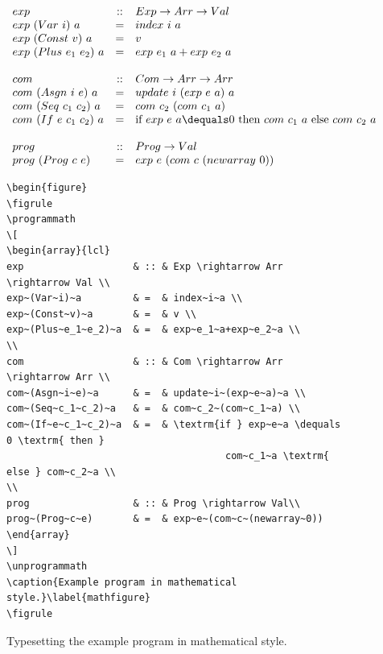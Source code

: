 \documentclass{article}
\begin{document}
\begin{figure}
\figrule
\programmath
\[
\begin{array}{lcl}
exp                   & :: & Exp \rightarrow Arr \rightarrow Val \\
exp~(Var~i)~a         & =  & index~i~a \\
exp~(Const~v)~a       & =  & v \\
exp~(Plus~e_1~e_2)~a  & =  & exp~e_1~a+exp~e_2~a \\
\\
com                   & :: & Com \rightarrow Arr \rightarrow Arr \\
com~(Asgn~i~e)~a      & =  & update~i~(exp~e~a)~a \\
com~(Seq~c_1~c_2)~a   & =  & com~c_2~(com~c_1~a) \\
com~(If~e~c_1~c_2)~a  & =  & \textrm{if } exp~e~a \dequals 0 \textrm{ then }
                                      com~c_1~a \textrm{ else } com~c_2~a \\
\\
prog                  & :: & Prog \rightarrow Val\\
prog~(Prog~c~e)       & =  & exp~e~(com~c~(newarray~0))
\end{array}
\]
\unprogrammath
\caption{Example program in mathematical style.}\label{mathfigure}
\figrule
\begin{center}
\begin{verbatim}
\begin{figure}
\figrule
\programmath
\[
\begin{array}{lcl}
exp                   & :: & Exp \rightarrow Arr \rightarrow Val \\
exp~(Var~i)~a         & =  & index~i~a \\
exp~(Const~v)~a       & =  & v \\
exp~(Plus~e_1~e_2)~a  & =  & exp~e_1~a+exp~e_2~a \\
\\
com                   & :: & Com \rightarrow Arr \rightarrow Arr \\
com~(Asgn~i~e)~a      & =  & update~i~(exp~e~a)~a \\
com~(Seq~c_1~c_2)~a   & =  & com~c_2~(com~c_1~a) \\
com~(If~e~c_1~c_2)~a  & =  & \textrm{if } exp~e~a \dequals 0 \textrm{ then }
                                      com~c_1~a \textrm{ else } com~c_2~a \\
\\
prog                  & :: & Prog \rightarrow Val\\
prog~(Prog~c~e)       & =  & exp~e~(com~c~(newarray~0))
\end{array}
\]
\unprogrammath
\caption{Example program in mathematical style.}\label{mathfigure}
\figrule
\end{verbatim}
\end{center}
\caption{Typesetting the example program in mathematical style.}\label{mathtypeset}
\figrule
\end{figure}
\end{document}
